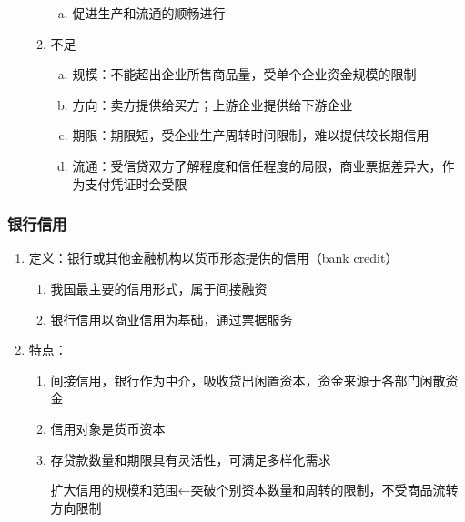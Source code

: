 \documentclass[12pt]{book}
\begin{document}
\begin{enumerate}[1.]
\begin{enumerate}[(1)]
                    \begin{enumerate}[a.]
                        \item 促进生产和流通的顺畅进行
                    \end{enumerate}
              \item 不足
                    \begin{enumerate}[a.]
                        \item 规模：不能超出企业所售商品量，受单个企业资金规模的限制
                        \item 方向：卖方提供给买方；上游企业提供给下游企业
                        \item 期限：期限短，受企业生产周转时间限制，难以提供较长期信用
                        \item 流通：受信贷双方了解程度和信任程度的局限，商业票据差异大，作为支付凭证时会受限
                    \end{enumerate}
          \end{enumerate}
\end{enumerate}







\subsubsection{银行信用}


\begin{enumerate}[1.]
    \item 定义：银行或其他金融机构以货币形态提供的信用（bank credit）
          \begin{enumerate}[(1)]
              \item 我国最主要的信用形式，属于间接融资
              \item 银行信用以商业信用为基础，通过票据服务
          \end{enumerate}
    \item 特点：
          \begin{enumerate}[(1)]
              \item 间接信用，银行作为中介，吸收贷出闲置资本，资金来源于各部门闲散资金
              \item 信用对象是货币资本
              \item 存贷款数量和期限具有灵活性，可满足多样化需求
                    \par 扩大信用的规模和范围←突破个别资本数量和周转的限制，不受商品流转方向限制
          \end{enumerate}
\end{enumerate}
\end{document}
